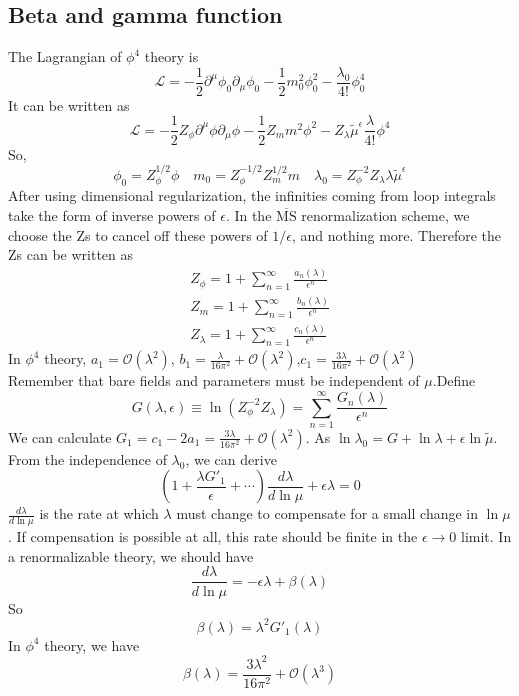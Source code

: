 \documentclass[cyan]{elegantnote}
\begin{document}
\subsection{Beta and gamma function}
\noindent
The Lagrangian of $\phi^4$ theory is 
\[\mathcal{L} = -\frac{1}{2} \partial^{\mu} \phi_0 \partial_{\mu} \phi_0 -\frac{1}{2}m_0^2 \phi_0^2 - \frac{\lambda_0}{4!}\phi_0^4\]
It can be written as
\[\mathcal{L} = -\frac{1}{2}Z_{\phi} \partial^{\mu} \phi \partial_{\mu} \phi -\frac{1}{2}Z_{m}m^2 \phi^2 - Z_{\lambda} \tilde{\mu}^{\epsilon}\frac{\lambda}{4!}\phi^4\]
So, 
\[\phi_0 = Z_{\phi}^{1/2}\phi \quad m_0 = Z_{\phi}^{-1/2} Z_{m}^{1/2}m \quad \lambda_0 = Z_{\phi}^{-2} Z_{\lambda} \lambda \tilde{\mu}^{\epsilon}\]
After using dimensional regularization, the infinities coming from loop integrals take the form of inverse powers of $\epsilon$. In the  $\mathrm{\overline{MS}}$ renormalization scheme, we choose the Zs to cancel off these powers of $1/\epsilon$, and nothing more. Therefore the Zs can be written as
\begin{eqnarray}
Z_{\phi} = 1 + \sum_{n=1}^{\infty} \frac{a_n(\lambda)}{\epsilon^n} \nonumber \\
Z_{m} = 1 + \sum_{n=1}^{\infty} \frac{b_n(\lambda)}{\epsilon^n} \nonumber \\
Z_{\lambda} = 1 + \sum_{n=1}^{\infty} \frac{c_n(\lambda)}{\epsilon^n} \nonumber 
\end{eqnarray}
In $\phi^4$ theory, $a_1 = \mathcal{O}(\lambda^2)$, $b_1 = \frac{\lambda}{16\pi^2} +  \mathcal{O}(\lambda^2)$,$c_1 = \frac{3\lambda}{16\pi^2} + \mathcal{O}(\lambda^2)$\\
Remember that bare fields and parameters must be independent of $\mu$.Define
\[G(\lambda,\epsilon) \equiv \ln(Z_{\phi}^{-2} Z_{\lambda}) = \sum_{n=1}^{\infty} \frac{G_n(\lambda)}{\epsilon^n}\]
We can calculate $G_1 = c_1 - 2a_1 = \frac{3\lambda}{16\pi^2} + \mathcal{O}(\lambda^2)$.
As $\ln \lambda_0 = G + \ln \lambda + \epsilon \ln \tilde{\mu} $. From the independence of $\lambda_0$, we can derive
\[\left ( 1 + \frac{\lambda G'_1}{\epsilon} + \cdots \right) \frac{d\lambda}{d\ln \mu} + \epsilon \lambda = 0\]
$\frac{d\lambda}{d\ln\mu}$ is the rate at which $\lambda$ must change to compensate for a small change in $\ln \mu$. If compensation is possible at all, this rate should be finite in the $\epsilon \to 0$ limit. In a renormalizable theory, we should have
\[\frac{d\lambda}{d\ln\mu} = -\epsilon\lambda + \beta(\lambda)\]
So
\[\beta(\lambda) = \lambda^2 G'_1(\lambda)\]
In $\phi^4$ theory, we have
\[\beta(\lambda) = \frac{3\lambda^2}{16\pi^2} + \mathcal{O}(\lambda^3)\]
\end{document}
